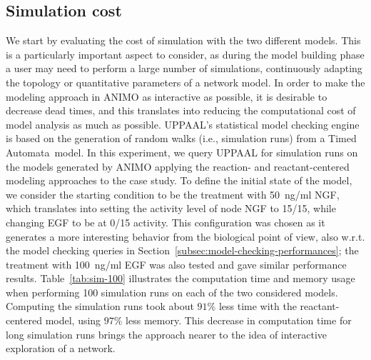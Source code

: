 \documentclass{llncs}
\newcommand{\tas}{Timed Automata}
\begin{document}
\subsection{Simulation cost}
We start by evaluating the cost of simulation with the two different models. This is a particularly
important aspect to consider, as during the model building phase a user may need to perform a large number of simulations,
continuously adapting the topology or quantitative parameters of a network model. In order to make
the modeling approach in ANIMO as interactive as possible, it is desirable to decrease dead times,
and this translates into reducing the computational cost of model analysis as much as possible.
UPPAAL's statistical model checking engine~\cite{uppaal-smc} is based on the generation of random walks (i.e., simulation runs) from a \tas\ model.
In this experiment, we query UPPAAL for simulation runs on the models
generated by ANIMO applying the reaction- and reactant-centered modeling approaches to the case study.
To define the initial state of the model, we consider the starting condition to be the treatment with 50~ng/ml NGF, which translates into
setting the activity level of node NGF to 15/15, while changing EGF to be at 0/15 activity.
This configuration was chosen as it generates a more interesting behavior from the biological point of view,
also w.r.t. the model checking queries in Section~\ref{subsec:model-checking-performances};
the treatment with 100~ng/ml EGF was also tested and gave similar performance results.
Table~\ref{tab:sim-100} illustrates the computation time and memory usage when performing 100 simulation runs on each of the
two considered models. Computing the simulation runs took about $91 \%$ less time with the reactant-centered model, using $97 \%$
less memory. This decrease in computation time for long simulation runs brings the approach nearer to the idea
of interactive exploration of a network.
\end{document}
